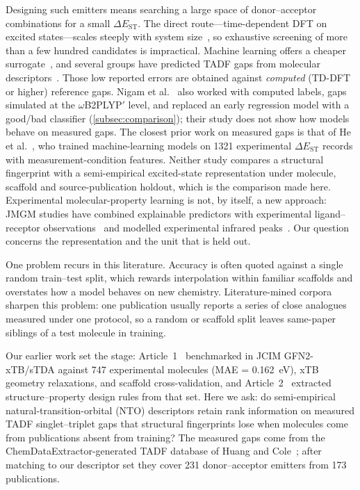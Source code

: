 Designing such emitters means searching a large space of donor--acceptor
combinations for a small $\Delta E_\text{ST}$. The direct route---time-dependent
DFT on excited states---scales steeply with system size~\cite{Curtarolo2013},
so exhaustive screening of more than a few hundred candidates is impractical.
Machine learning offers a cheaper surrogate~\cite{Butler2018, Pyzer-Knapp2022},
and several groups have predicted TADF gaps from molecular
descriptors~\cite{Gomez-Bombarelli2016, Barneschi2024}. Those low reported errors
are obtained against \emph{computed} (TD-DFT or higher) reference gaps. Nigam
et al.~\cite{Nigam2024} also worked with computed labels, gaps simulated at the
$\omega$B2PLYP$'$ level, and replaced an early regression model with a good/bad
classifier (\cref{subsec:comparison}); their study does not show how models behave
on measured gaps. The closest prior work on measured gaps is that of He
et al.~\cite{He2026}, who trained machine-learning models on \num{1321}
experimental $\Delta E_\text{ST}$ records with measurement-condition features.
Neither study compares a structural fingerprint with a semi-empirical
excited-state representation under molecule, scaffold and source-publication
holdout, which is the comparison made here.
Experimental molecular-property learning is not, by itself, a new approach:
JMGM studies have combined explainable predictors with experimental
ligand--receptor observations~\cite{Ferri2026TAS2R} and modelled experimental
infrared peaks~\cite{Noreen2026IR}. Our question concerns the representation and
the unit that is held out.

One problem recurs in this literature. Accuracy is often quoted against a single random train--test split, which rewards
interpolation within familiar scaffolds and overstates how a model behaves on new
chemistry. Literature-mined corpora sharpen this problem: one publication usually
reports a series of close analogues measured under one protocol, so a random or
scaffold split leaves same-paper siblings of a test molecule in training.

Our earlier work set the stage: Article~1~\cite{Tchapet2024_xTB} benchmarked in JCIM
GFN2-xTB/sTDA against \num{747} experimental molecules
(MAE = \qty{0.162}{\electronvolt}), xTB geometry relaxations, and scaffold
cross-validation, and Article~2~\cite{Tchapet2024_DataDriven}
extracted structure--property design rules from that set. Here we ask: do
semi-empirical natural-transition-orbital (NTO) descriptors retain rank information
on measured TADF singlet--triplet gaps that structural fingerprints lose when
molecules come from publications absent from training? The measured gaps come from
the ChemDataExtractor-generated TADF database of Huang and Cole~\cite{HuangCole2024};
after matching to our descriptor set they cover \num{231} donor--acceptor emitters
from \num{173} publications.

